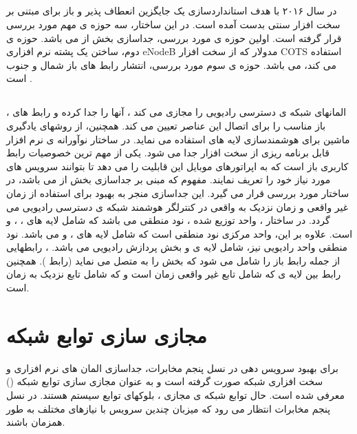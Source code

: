 \subsection{}
در سال ۲۰۱۶ با هدف استانداردسازی یک جایگزین انعطاف پذیر و باز برای 
مبتنی بر سخت افزار سنتی بدست آمده است.
 در این ساختار، سه حوزه ی مهم مورد بررسی قرار گرفته است.
اولین حوزه ی مورد بررسی، جداسازی بخش  از 
می باشد. حوزه ی دوم،
ساختن یک پشته نرم افزاری eNodeB مدولار که از سخت افزار COTS استفاده می کند، می باشد.
حوزه ی سوم مورد بررسی، انتشار رابط های باز شمال و جنوب است
\cite{xran}.
\subsection{}
، المانهای شبکه ی دسترسی رادیویی را مجازی می کند ، آنها را جدا کرده و رابط های باز مناسب را 
برای اتصال این عناصر
تعیین می کند. همچنین، 
از روشهای یادگیری ماشین برای هوشمندسازی لایه های 
 استفاده می نماید. 
 در ساختار نوآورانه ی 
 نرم افزار قابل برنامه ریزی 
 از سخت افزار جدا می شود.
  یکی از مهم ترین خصوصیات
  رابط کاربری باز است که به اپراتورهای موبایل این قابلیت را می دهد تا بتوانند سرویس های مورد نیاز خود را تعریف نمایند.
  مفهوم 
  که مبنی بر جداسازی 
   بخش  از 
می باشد، در ساختار 
مورد بررسی قرار می گیرد.
این جداسازی منجر به بهبود 
برای استفاده از زمان غیر واقعی و زمان نزدیک به واقعی در کنترلگر هوشمند شبکه ی دسترسی رادیویی می گردد.
در ساختار
،
واحد توزیع شده ،
نود منطقی می باشد که شامل لایه های 
،
،
و
است.
علاوه بر این، واحد مرکزی 
نود منطقی است که شامل لایه های 
،
و 
می باشد.
نود منطقی واحد رادیویی
نیز، شامل لایه ی 
و بخش پردازش رادیویی می باشد.
،
رابطهایی از جمله رابط 
باز را شامل می شود که بخش  را به  متصل می نماید
(رابط 
). 
همچنین
 رابط 
 بین لایه ی 
  که شامل 
  تابع غیر واقعی زمان است و 
  که شامل تابع نزدیک به زمان است. 
\section{مجازی سازی توابع شبکه}
برای بهبود سرویس دهی در نسل پنجم مخابرات، جداسازی المان های نرم افزاری و سخت افزاری شبکه صورت گرفته است و به عنوان 
مجازی سازی توابع شبکه () 
معرفی شده است.
  حال توابع شبکه ی مجازی
   ،
  بلوکهای توابع سیستم هستند.
در نسل پنجم مخابرات 
  انتظار می رود که
   میزبان چندین سرویس
   با نیازهای مختلف به طور همزمان
    باشند.
